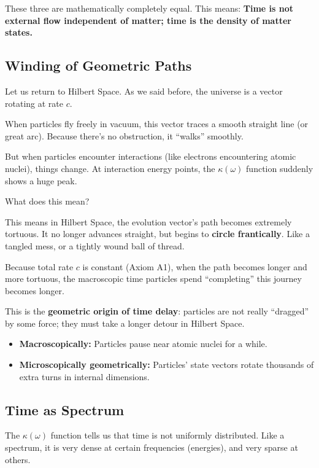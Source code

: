 \documentclass[11pt,a4paper,twoside]{book}
\begin{document}
These three are mathematically completely equal. This means: \textbf{Time is not external flow independent of matter; time is the density of matter states.}

\subsection{Winding of Geometric Paths}

Let us return to Hilbert Space. As we said before, the universe is a vector rotating at rate $c$.

When particles fly freely in vacuum, this vector traces a smooth straight line (or great arc). Because there's no obstruction, it ``walks'' smoothly.

But when particles encounter interactions (like electrons encountering atomic nuclei), things change. At interaction energy points, the $\kappa(\omega)$ function suddenly shows a huge peak.

What does this mean?

This means in Hilbert Space, the evolution vector's path becomes extremely tortuous. It no longer advances straight, but begins to \textbf{circle frantically}. Like a tangled mess, or a tightly wound ball of thread.

Because total rate $c$ is constant (Axiom A1), when the path becomes longer and more tortuous, the macroscopic time particles spend ``completing'' this journey becomes longer.

This is the \textbf{geometric origin of time delay}: particles are not really ``dragged'' by some force; they must take a longer detour in Hilbert Space.

\begin{itemize}
\item \textbf{Macroscopically:} Particles pause near atomic nuclei for a while.

\item \textbf{Microscopically geometrically:} Particles' state vectors rotate thousands of extra turns in internal dimensions.
\end{itemize}

\subsection{Time as Spectrum}

The $\kappa(\omega)$ function tells us that time is not uniformly distributed. Like a spectrum, it is very dense at certain frequencies (energies), and very sparse at others.
\end{document}
